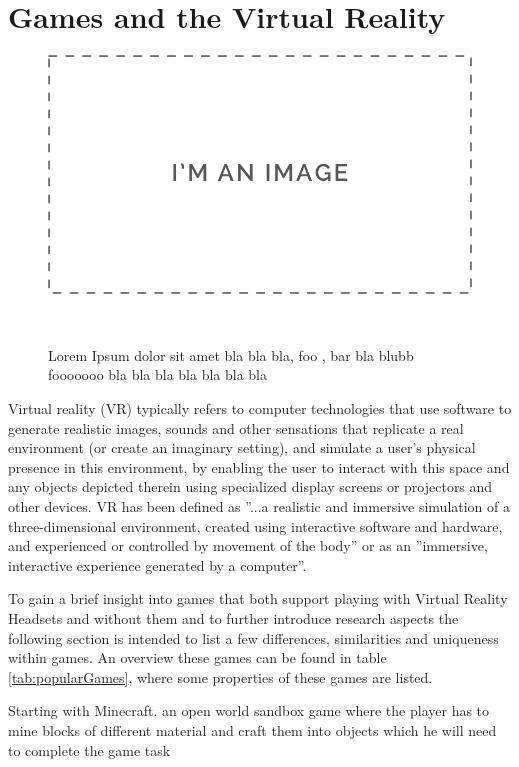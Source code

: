 
\section{Games and the Virtual Reality}

\begin{figure}
	\centering
	\includegraphics[width=0.9\columnwidth]{./figures/placeholder}
	\caption[blabla]{Lorem Ipsum dolor sit amet bla bla bla, foo , bar bla blubb fooooooo bla bla bla bla bla bla bla}~\label{fig:foobar1}
\end{figure}

Virtual reality (VR) typically refers to computer technologies that use software to generate realistic images, sounds and other sensations that replicate a real environment (or create an imaginary setting), and simulate a user's physical presence in this environment, by enabling the user to interact with this space and any objects depicted therein using specialized display screens or projectors and other devices. VR has been defined as ''...a realistic and immersive simulation of a three-dimensional environment, created using interactive software and hardware, and experienced or controlled by movement of the body'' or as an ''immersive, interactive experience generated by a computer''.

To gain a brief insight into games that both support playing with Virtual Reality Headsets and without them and to further introduce research aspects the following section is intended to list a few differences, similarities and uniqueness within games. An overview these games can be found in table \ref{tab:popularGames}, where some properties of these games are listed. 

Starting with Minecraft. an open world sandbox game where the player has to mine blocks of different material and craft them into objects which he will need to complete the game task 

